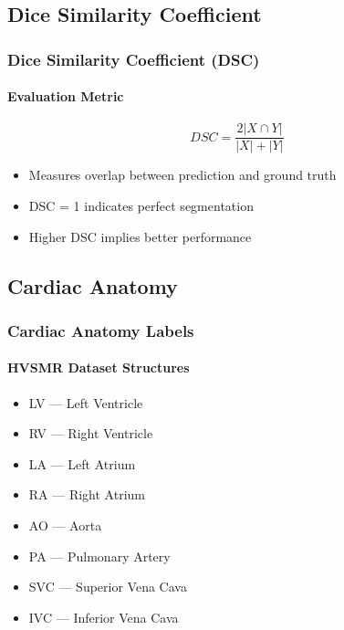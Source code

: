 \documentclass[nometaot,lecture,amberg,autotoc,toc=twocolumn,indicatelastpageofframe,footlinebox]{OTHAWbeamer}
\begin{document}
\subsection{Dice Similarity Coefficient}

\begin{frame}
    \frametitle{Dice Similarity Coefficient (DSC)}
    \framesubtitle{Evaluation Metric}

    \[
    DSC = \frac{2|X \cap Y|}{|X| + |Y|}
    \]

    \vspace{1em}

    \begin{itemize}
        \item Measures overlap between prediction and ground truth
        \item DSC = 1 indicates perfect segmentation
        \item Higher DSC implies better performance
    \end{itemize}

\end{frame}

\subsection{Cardiac Anatomy}

\begin{frame}
    \frametitle{Cardiac Anatomy Labels}
    \framesubtitle{HVSMR Dataset Structures}

    \begin{itemize}
        \item LV — Left Ventricle
        \item RV — Right Ventricle
        \item LA — Left Atrium
        \item RA — Right Atrium
        \item AO — Aorta
        \item PA — Pulmonary Artery
        \item SVC — Superior Vena Cava
        \item IVC — Inferior Vena Cava
    \end{itemize}

    \vspace{1em}


\end{frame}
\end{document}
